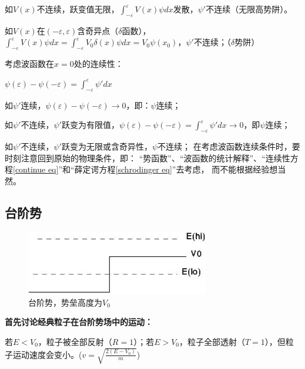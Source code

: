 如$V(x)$不连续，跃变值无限，$\int_{ - \varepsilon }^\varepsilon  {V(x)\psi dx} $发散，$\psi '$不连续（无限高势阱）。

如$V(x)$在$\left( { - \varepsilon ,\varepsilon } \right)$含奇异点（$\delta $函数），$\int_{ - \varepsilon }^\varepsilon  {V(x)\psi dx}  = \int_{ - \varepsilon }^\varepsilon  {V_0 \delta (x)\psi dx = V_0 \psi (x_0 )} $，$\psi '$不连续；（$\delta$势阱）

考虑波函数在$x=0$处的连续性：

\begin{center}
$\psi (\varepsilon ) - \psi ( - \varepsilon ) = \int_{ - \varepsilon }^\varepsilon  {\psi 'dx} $
\end{center}

如$\psi '$连续，$\psi (\varepsilon ) - \psi ( - \varepsilon ) \to 0$，即：$\psi$连续；

如$\psi '$不连续，$\psi '$跃变为有限值，$\psi (\varepsilon ) - \psi ( - \varepsilon ) = \int_{ - \varepsilon }^\varepsilon  {\psi 'dx}  \to 0$，即$\psi$连续；

如$\psi '$不连续，$\psi '$跃变为无限或含奇异性，$\psi$不连续；
在考虑波函数连续条件时，要时刻注意回到原始的物理条件，即：
``势函数''、``波函数的统计解释''、``连续性方程\ref{continue eq}''和``薛定谔方程\ref{schrodinger eq}''去考虑，
而不能根据经验想当然。

\subsection{台阶势}


\begin{figure}[h]
\begin{center}
\includegraphics[clip,width=8cm]{1DProblem/11-1.ps}
\caption{台阶势，势垒高度为$V_0$}
\end{center}
\end{figure}

\textbf{首先讨论经典粒子在台阶势场中的运动：}

若$E < V_0 $，粒子被全部反射（$R=1$）；若$E > V_0 $，粒子全部透射（$T=1$），但粒子运动速度会变小。($v = \sqrt {\frac{{2(E - V_0 )}}{m}}$)

